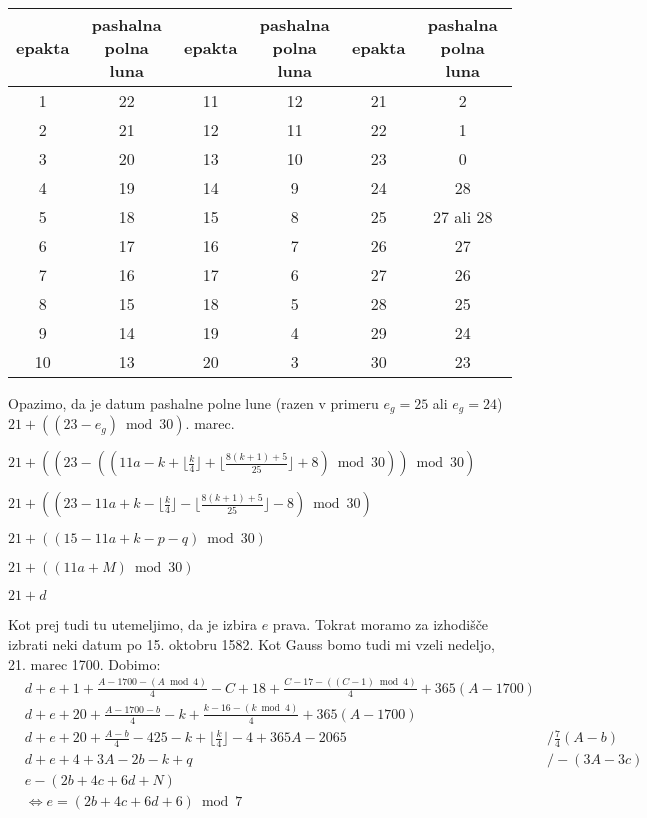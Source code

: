 \documentclass[a4paper,12pt]{article}
\begin{document}
\begin{center}
    \begin{tabular}{| c c | c c | c c |}
        \hline
        epakta & \makecell{pashalna \\ polna luna} & epakta & \makecell{pashalna \\ polna luna} & epakta & \makecell{pashalna \\ polna luna} \\ \hline
        1 & 22 & 11 & 12 & 21 & 2 \\  
        2 & 21 & 12 & 11 & 22 & 1 \\
        3 & 20 & 13 & 10 & 23 & 0 \\
        4 & 19 & 14 & 9 & 24 & 28 \\
        5 & 18 & 15 & 8 & 25 & 27 ali 28 \\
        6 & 17 & 16 & 7 & 26 & 27 \\
        7 & 16 & 17 & 6 & 27 & 26 \\
        8 & 15 & 18 & 5 & 28 & 25 \\
        9 & 14 & 19 & 4 & 29 & 24 \\
        10 & 13 & 20 & 3 & 30 & 23 \\ \hline
    \end{tabular}
\end{center} %

Opazimo, da je datum pashalne polne lune (razen v primeru 
$e_g = 25$ ali $e_g = 24$) $21 + ((23 - e_g) \bmod 30)$. marec.

$21 + ((23 - ((11a - k + \lfloor \frac{k}{4} \rfloor + \lfloor \frac{8 (k + 1) + 5}{25} \rfloor + 8) \bmod 30)) \bmod 30)$

$21 + ((23 - 11a + k - \lfloor \frac{k}{4} \rfloor - \lfloor \frac{8 (k + 1) + 5}{25} \rfloor - 8) \bmod 30)$

$21 + ((15 - 11a + k - p - q) \bmod 30)$

$21 + ((11a + M) \bmod 30)$

$21 + d$

Kot prej tudi tu utemeljimo, da je izbira $e$ prava. Tokrat moramo za 
izhodišče izbrati neki datum po 15. oktobru 1582. Kot Gauss bomo tudi mi 
vzeli nedeljo, 21. marec 1700.
Dobimo:
\begin{align*}
    &d + e + 1 + \textstyle \frac{A - 1700 - (A \bmod 4)}{4} - C + 18 + \frac{C - 17 - ((C - 1) \bmod 4)}{4} + 365 (A - 1700) \\
    &d + e + 20 + \textstyle \frac{A - 1700 - b}{4} - k + \frac{k - 16 - (k \bmod 4)}{4} + 365(A - 1700) \\
    &d + e + 20 + \textstyle \frac{A - b}{4} - 425 - k + \lfloor \frac{k}{4} \rfloor - 4 + 365A - 2065 &/ \frac{7}{4} (A - b) \\
    &d + e + 4 + 3A - 2b - k + q &/ -(3A - 3c) \\
    &e - (2 b + 4 c + 6 d + N) \\
    &\Leftrightarrow e = (2b + 4c + 6d + 6) \bmod 7
\end{align*}
\end{document}
